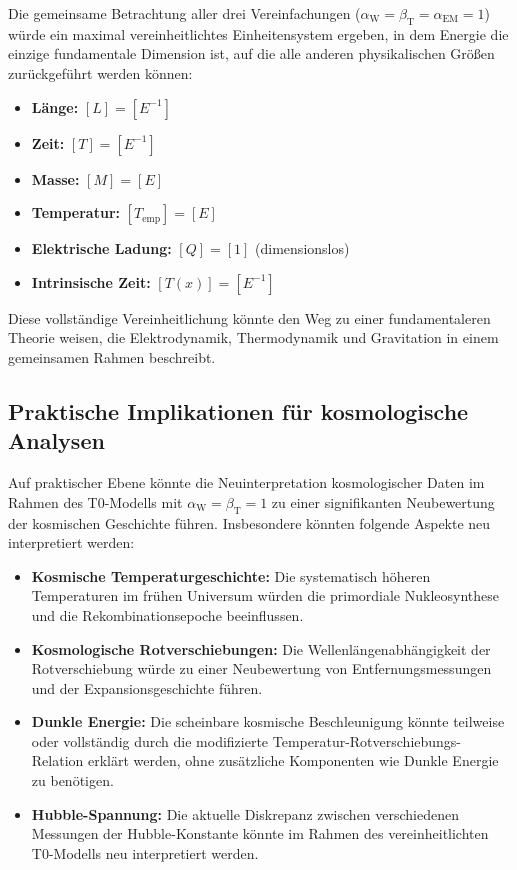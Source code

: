 \documentclass[12pt,a4paper]{article}
\newcommand{\Tfield}{T(x)}
\newcommand{\alphaEM}{\alpha_{\text{EM}}}
\newcommand{\betaT}{\beta_{\text{T}}}
\newcommand{\alphaW}{\alpha_{\text{W}}}
\begin{document}
	Die gemeinsame Betrachtung aller drei Vereinfachungen (\(\alphaW = \betaT = \alphaEM = 1\)) würde ein maximal vereinheitlichtes Einheitensystem ergeben, in dem Energie die einzige fundamentale Dimension ist, auf die alle anderen physikalischen Größen zurückgeführt werden können:
	
	\begin{tcolorbox}[colback=blue!5!white,colframe=blue!75!black,title=Vollständig vereinheitlichtes Einheitensystem]
		\begin{itemize}
			\item \textbf{Länge:} \([L] = [E^{-1}]\)
			\item \textbf{Zeit:} \([T] = [E^{-1}]\)
			\item \textbf{Masse:} \([M] = [E]\)
			\item \textbf{Temperatur:} \([T_{\text{emp}}] = [E]\)
			\item \textbf{Elektrische Ladung:} \([Q] = [1]\) (dimensionslos)
			\item \textbf{Intrinsische Zeit:} \([\Tfield] = [E^{-1}]\)
		\end{itemize}
	\end{tcolorbox}
	
	Diese vollständige Vereinheitlichung könnte den Weg zu einer fundamentaleren Theorie weisen, die Elektrodynamik, Thermodynamik und Gravitation in einem gemeinsamen Rahmen beschreibt.
	
	\subsection{Praktische Implikationen für kosmologische Analysen}
	
	Auf praktischer Ebene könnte die Neuinterpretation kosmologischer Daten im Rahmen des T0-Modells mit \(\alphaW = \betaT = 1\) zu einer signifikanten Neubewertung der kosmischen Geschichte führen. Insbesondere könnten folgende Aspekte neu interpretiert werden:
	
	\begin{itemize}
		\item \textbf{Kosmische Temperaturgeschichte:} Die systematisch höheren Temperaturen im frühen Universum würden die primordiale Nukleosynthese und die Rekombinationsepoche beeinflussen.
		
		\item \textbf{Kosmologische Rotverschiebungen:} Die Wellenlängenabhängigkeit der Rotverschiebung würde zu einer Neubewertung von Entfernungsmessungen und der Expansionsgeschichte führen.
		
		\item \textbf{Dunkle Energie:} Die scheinbare kosmische Beschleunigung könnte teilweise oder vollständig durch die modifizierte Temperatur-Rotverschiebungs-Relation erklärt werden, ohne zusätzliche Komponenten wie Dunkle Energie zu benötigen.
		
		\item \textbf{Hubble-Spannung:} Die aktuelle Diskrepanz zwischen verschiedenen Messungen der Hubble-Konstante könnte im Rahmen des vereinheitlichten T0-Modells neu interpretiert werden.
	\end{itemize}
	
\end{document}
